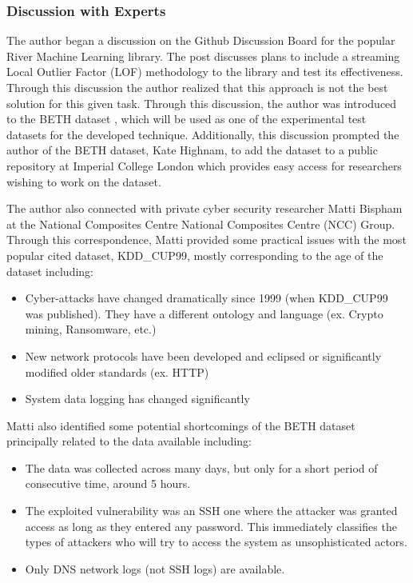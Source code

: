 \subsubsection{Discussion with Experts}

The author began a discussion on the Github Discussion Board \parencite{RiverGithub2022} for the popular River \parencite{2020river} Machine Learning library. The post discusses plans to include a streaming Local Outlier Factor (LOF) methodology to the library and test its effectiveness. Through this discussion the author realized that this approach is not the best solution for this given task. Through this discussion, the author was introduced to the BETH dataset \parencite{beth-dataset}, which will be used as one of the experimental test datasets for the developed technique. Additionally, this discussion prompted the author of the BETH dataset, Kate Highnam, to add the dataset to a public repository at Imperial College London which provides easy access for researchers wishing to work on the dataset.

The author also connected with private cyber security researcher Matti Bispham \parencite{Bispham-email:private} at the National Composites Centre National Composites Centre (NCC) Group. Through this correspondence, Matti provided some practical issues with the most popular cited dataset, KDD\_CUP99, mostly corresponding to the age of the dataset including:

\begin{itemize}[leftmargin=2cm]
    \item Cyber-attacks have changed dramatically since 1999 (when KDD\_CUP99 was published). They have a different ontology and language (ex. Crypto mining, Ransomware, etc.)
    \item New network protocols have been developed and eclipsed or significantly modified older standards (ex. HTTP)
    \item System data logging has changed significantly
\end{itemize}

Matti also identified some potential shortcomings of the BETH dataset principally related to the data available including:

\begin{itemize}[leftmargin=2cm]
    \item The data was collected across many days, but only for a short period of consecutive time, around 5 hours.
    \item The exploited vulnerability was an SSH one where the attacker was granted access as long as they entered any password. This immediately classifies the types of attackers who will try to access the system as unsophisticated actors.
    \item Only DNS network logs (not SSH logs) are available.
\end{itemize}

